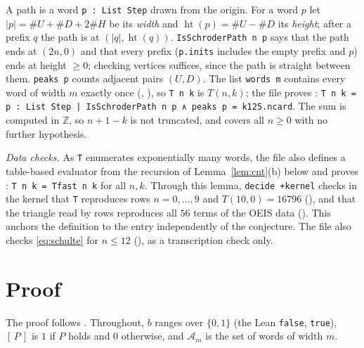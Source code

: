 \documentclass[11pt]{amsart}
\theoremstyle{plain}
\theoremstyle{definition}
\newcommand{\Z}{\mathbb{Z}}
\newcommand{\Av}{\mathcal{A}}
\newcommand{\ib}[1]{[\,#1\,]}
\newcommand{\lb}{\char123}
\newcommand{\rb}{\char125}
\begin{document}
A path is a word \texttt{p : List Step} drawn from the origin. For a word $p$ let $|p|=\#U+\#D+2\#H$ be its \emph{width} and $\operatorname{ht}(p)=\#U-\#D$ its \emph{height}; after a prefix $q$ the path is at $(|q|,\operatorname{ht}(q))$. \texttt{IsSchroderPath n p} says that the path ends at $(2n,0)$ and that every prefix (\texttt{p.inits} includes the empty prefix and $p$) ends at height $\ge0$; checking vertices suffices, since the path is straight between them. \texttt{peaks p} counts adjacent pairs $(U,D)$. The list \texttt{words m} contains every word of width $m$ exactly once (, ), so \texttt{T n k} is $T(n,k)$; the file proves : \texttt{T n k = \lb p : List Step | IsSchroderPath n p ∧ peaks p = k\rb.ncard}. The sum is computed in $\Z$, so $n+1-k$ is not truncated, and  covers all $n\ge0$ with no further hypothesis.

\emph{Data checks.} As \texttt{T} enumerates exponentially many words, the file also defines a table-based evaluator  from the recursion of Lemma~\ref{lem:cnt}(b) below and proves : \texttt{T n k = Tfast n k} for all $n,k$. Through this lemma, \texttt{decide +kernel} checks in the kernel that \texttt{T} reproduces rows $n=0,\dots,9$ and $T(10,0)=16796$ (), and that the triangle read by rows reproduces all $56$ terms of the OEIS data (). This anchors the definition to the entry independently of the conjecture. The file also checks \eqref{eq:schulte} for $n\le12$ (), as a transcription check only.

\section{Proof}\label{sec:proof}

The proof follows . Throughout, $b$ ranges over $\{0,1\}$ (the Lean \texttt{false}, \texttt{true}), $\ib{P}$ is $1$ if $P$ holds and $0$ otherwise, and $\Av_m$ is the set of words of width $m$.
\end{document}
